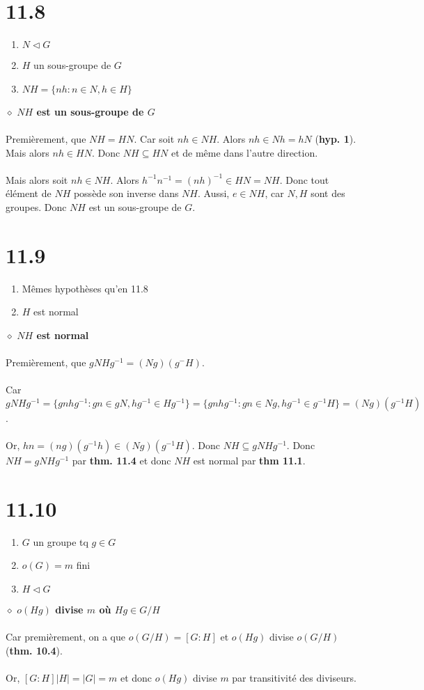 \documentclass[a4paper,10pt]{article}
\begin{document}
\section*{11.8}
\begin{enumerate}
	\item $N \triangleleft G$
	\item $H$ un sous-groupe de $G$
	\item $NH = \{nh : n \in N, h \in H \}$
\end{enumerate}
$\diamond$ \textbf{$NH$ est un sous-groupe de $G$}
\\
\\
Premièrement, que $NH = HN$. Car soit $nh \in NH$. Alors $nh \in Nh = hN$ (\textbf{hyp. 1}). Mais alors $nh \in HN$. Donc $NH \subseteq HN$ et de même dans l'autre direction.
\\
\\
Mais alors soit $nh \in NH$. Alors $h^{-1}n^{-1} = (nh)^{-1} \in HN = NH$. Donc tout élément de $NH$ possède son inverse dans $NH$. Aussi, $e \in NH$, car $N,H$ sont des groupes. Donc $NH$ est un sous-groupe de $G$. 

\section*{11.9}
\begin{enumerate}
	\item Mêmes hypothèses qu'en 11.8
	\item $H$ est normal
\end{enumerate}
$\diamond$ \textbf{$NH$ est normal}
\\
\\
Premièrement, que $gNHg^{-1} = (Ng)(g^{-}H)$. 
\\
\\
Car $gNHg^{-1} = \{gnhg^{-1} : gn \in gN, hg^{-1} \in Hg^{-1}\} =
 \{gnhg^{-1} : gn \in Ng, hg^{-1} \in g^{-1}H\} = (Ng)(g^{-1}H)$.
\\
\\
Or, $hn = (ng)(g^{-1}h) \in (Ng)(g^{-1}H)$. Donc $NH \subseteq gNHg^{-1}$. Donc $NH = gNHg^{-1}$ par \textbf{thm. 11.4} et donc $NH$ est normal par \textbf{thm 11.1}.

\section*{11.10}
\begin{enumerate}
	\item $G$ un groupe tq $g \in G$
	\item $o(G) = m$ fini
	\item $H \triangleleft G$
\end{enumerate}
$\diamond$ \textbf{$o(Hg)$ divise $m$ où $Hg \in G/H$}
\\
\\
Car premièrement, on a que $o(G/H) = [G:H]$ et $o(Hg)$ divise $o(G/H)$ (\textbf{thm. 10.4}).
\\
\\
Or, $[G:H]|H| = |G| = m$ et donc $o(Hg)$ divise $m$ par transitivité des diviseurs.
\end{document}
